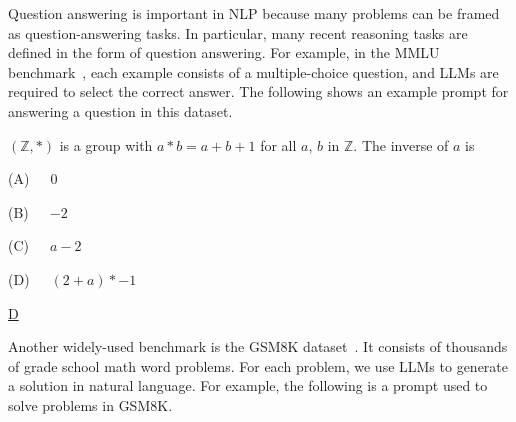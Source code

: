 Question answering is important in NLP because many problems can be framed as question-answering tasks. In particular, many recent reasoning tasks are defined in the form of question answering. For example, in the MMLU benchmark~\cite{hendrycks-etal:2021measuring}, each example consists of a multiple-choice question, and LLMs are required to select the correct answer. The following shows an example prompt for answering a question in this dataset.

\vspace{0.5em}
\begin{tcolorbox}

\begingroup
\setlength{\leftskip}{2em}
\setlength{\rightskip}{2em}

$(\mathbb{Z},*)$ is a group with $a*b = a+b+1$ for all $a$, $b$ in $\mathbb{Z}$. The inverse of $a$ is

\vspace{0.5em}

(A)\ \ \ $0$

\vspace{0.3em}

(B)\ \ \ $-2$

\vspace{0.3em}

(C)\ \ \ $a-2$

\vspace{0.3em}

(D)\ \ \ $(2+a)*-1$

\vspace{0.5em}

\underline{D}

\endgroup

\end{tcolorbox}
\vspace{0.5em}

Another widely-used benchmark is the GSM8K dataset~\cite{cobbe-etal:2021training}. It consists of thousands of grade school math word problems. For each problem, we use LLMs to generate a solution in natural language. For example, the following is a prompt used to solve problems in GSM8K.

